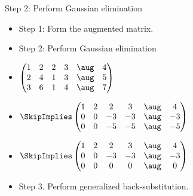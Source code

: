 \documentclass{beamer}
\begin{document}
\begin{frame}{Step 2: Perform Gaussian elimination}

\begin{itemize}
\item Step 1: Form the augmented matrix.
\item Step 2: Perform Gaussian elimination
\item
$
\begin{pmatrix}
1 & 2 & 2 & 3  & \aug &  4 \\
2 & 4 & 1 & 3  & \aug &  5 \\
3 & 6 & 1 & 4  & \aug &  7
\end{pmatrix}
$
\item
$
\SkipImplies
\begin{pmatrix}
1 & 2 & 2 &   3  & \aug &  4 \\
0 & 0 & -3 & -3  & \aug & -3 \\
0 & 0 & -5 & -5  & \aug & -5
\end{pmatrix}
$
\item
$
\SkipImplies
\begin{pmatrix}
1 & 2 &  2 &  3 &   \aug &  4 \\
0 & 0 & -3 & -3 &   \aug & -3 \\
0 & 0 &  0 &  0 &   \aug & 0
\end{pmatrix}
$
\item Step 3. Perform generalized back-substitution.
\end{itemize}
\end{frame}
\end{document}
